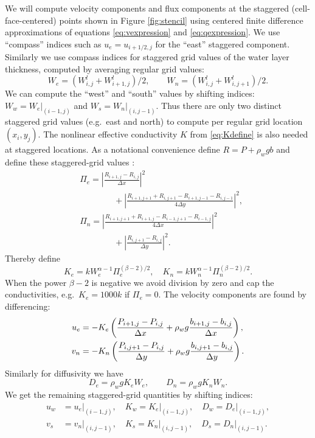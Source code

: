 \documentclass[gmd]{copernicus}   %
\begin{document}
We will compute velocity components and flux components at the staggered (cell-face-centered) points shown in Figure \ref{fig:stencil} using centered finite difference approximations of equations \eqref{eq:vexpression} and \eqref{eq:qexpression}.  We use ``compass'' indices such as $u_e = u_{i+1/2,j}$ for the ``east'' staggered component.  Similarly we use compass indices for staggered grid values of the water layer thickness, computed by averaging regular grid values:
\begin{equation}
W_e = (W_{i,j}^l + W_{i+1,j}^l)/2, \qquad W_n = (W_{i,j}^l + W_{i,j+1}^l)/2. \label{eq:stagW}
\end{equation}
We can compute the ``west'' and ``south'' values by shifting indices: $W_w = W_e\big|_{(i-1,j)}$ and $W_s = W_n\big|_{(i,j-1)}$.  Thus there are only two distinct staggered grid values (e.g.~east and north) to compute per regular grid location $(x_i,y_j)$.
The nonlinear effective conductivity $K$ from \eqref{eq:Kdefine} is also needed at staggered locations.  As a notational convenience define $R=P+\rho_w g b$ and define these staggered-grid values \citep[compare][]{Mahaffy}:
\begin{align*}
&\Pi_e = \left|\frac{R_{i+1,j}-R_{i,j}}{\Delta x}\right|^2 \\
&\qquad \qquad + \left|\frac{R_{i+1,j+1}+R_{i,j+1} - R_{i+1,j-1}-R_{i,j-1}}{4\Delta y}\right|^2, \\
&\Pi_n = \left|\frac{R_{i+1,j+1}+R_{i+1,j} - R_{i-1,j+1}-R_{i-1,j}}{4\Delta x}\right|^2 \\
&\qquad \qquad + \left|\frac{R_{i,j+1}-R_{i,j}}{\Delta y}\right|^2.
\end{align*}
Thereby define
\begin{equation}
K_e = k W_e^{\alpha-1} \Pi_e^{(\beta-2)/2}, \quad K_n = k W_n^{\alpha-1} \Pi_n^{(\beta-2)/2}.  \label{eq:stagK}
\end{equation}
When the power $\beta-2$ is negative we avoid division by zero and cap the conductivities, e.g.~$K_e = 1000 k$ if $\Pi_e = 0$.  The velocity components are found by differencing:
\begin{align}
u_e &= - K_e \left(\frac{P_{i+1,j}-P_{i,j}}{\Delta x} + \rho_w g \frac{b_{i+1,j}-b_{i,j}}{\Delta x}\right),  \label{eq:velocitycomp} \\
v_n &= - K_n \left(\frac{P_{i,j+1}-P_{i,j}}{\Delta y} + \rho_w g \frac{b_{i,j+1}-b_{i,j}}{\Delta y}\right). \notag
\end{align}
Similarly for diffusivity we have
\begin{equation}
D_e = \rho_w g K_e W_e, \qquad D_n = \rho_w g K_n W_n.  \label{eq:diffusivitycomp}
\end{equation}
We get the remaining staggered-grid quantities by shifting indices:
\begin{align*}
u_w &= u_e\big|_{(i-1,j)}, \quad K_w = K_e\big|_{(i-1,j)}, \quad D_w = D_e\big|_{(i-1,j)}, \\
v_s &= v_n\big|_{(i,j-1)}, \quad K_s = K_n\big|_{(i,j-1)}, \quad D_s = D_n\big|_{(i,j-1)}.
\end{align*}
\end{document}
